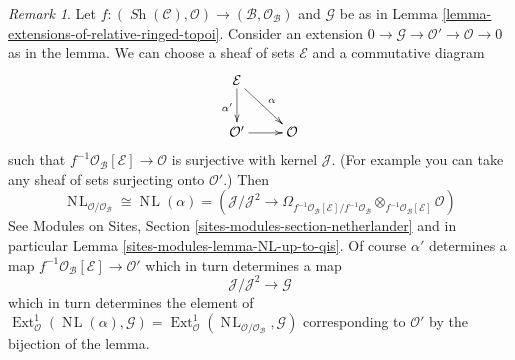 \documentclass{stacks-project}
\theoremstyle{plain}
\theoremstyle{definition}
\theoremstyle{remark}
\newtheorem{remark}[subsection]{Remark}
\numberwithin{equation}{subsection}
\def\Ext{\mathop{\mathrm{Ext}}\nolimits}
\def\Sh{\mathop{\mathit{Sh}}\nolimits}
\def\NL{\mathop{N\!L}\nolimits}
\begin{document}
\begin{remark}
\label{remark-extensions-of-relative-ringed-topoi}
Let $f : (\Sh(\mathcal{C}), \mathcal{O}) \to
(\mathcal{B}, \mathcal{O}_\mathcal{B})$ and $\mathcal{G}$
be as in Lemma \ref{lemma-extensions-of-relative-ringed-topoi}.
Consider an extension
$0 \to \mathcal{G} \to \mathcal{O}' \to \mathcal{O} \to 0$
as in the lemma. We can choose a sheaf of sets $\mathcal{E}$
and a commutative diagram
$$
\xymatrix{
\mathcal{E} \ar[d]_{\alpha'} \ar[rd]^\alpha \\
\mathcal{O}' \ar[r] & \mathcal{O}
}
$$
such that $f^{-1}\mathcal{O}_\mathcal{B}[\mathcal{E}] \to \mathcal{O}$
is surjective with kernel $\mathcal{J}$.
(For example you can take any sheaf of sets surjecting
onto $\mathcal{O}'$.) Then
$$
\NL_{\mathcal{O}/\mathcal{O}_\mathcal{B}} \cong \NL(\alpha) = 
\left(
\mathcal{J}/\mathcal{J}^2
\longrightarrow
\Omega_{f^{-1}\mathcal{O}_\mathcal{B}[\mathcal{E}]/
f^{-1}\mathcal{O}_\mathcal{B}}
\otimes_{f^{-1}\mathcal{O}_\mathcal{B}[\mathcal{E}]} \mathcal{O}\right)
$$
See Modules on Sites, Section \ref{sites-modules-section-netherlander}
and in particular Lemma \ref{sites-modules-lemma-NL-up-to-qis}.
Of course $\alpha'$ determines a map
$f^{-1}\mathcal{O}_\mathcal{B}[\mathcal{E}] \to \mathcal{O}'$
which in turn determines a map
$$
\mathcal{J}/\mathcal{J}^2 \longrightarrow \mathcal{G}
$$
which in turn determines the element of
$\Ext^1_\mathcal{O}(\NL(\alpha), \mathcal{G}) =
\Ext^1_\mathcal{O}(\NL_{\mathcal{O}/\mathcal{O}_\mathcal{B}}, \mathcal{G})$
corresponding to $\mathcal{O}'$ by the bijection of the lemma.
\end{remark}
\end{document}
